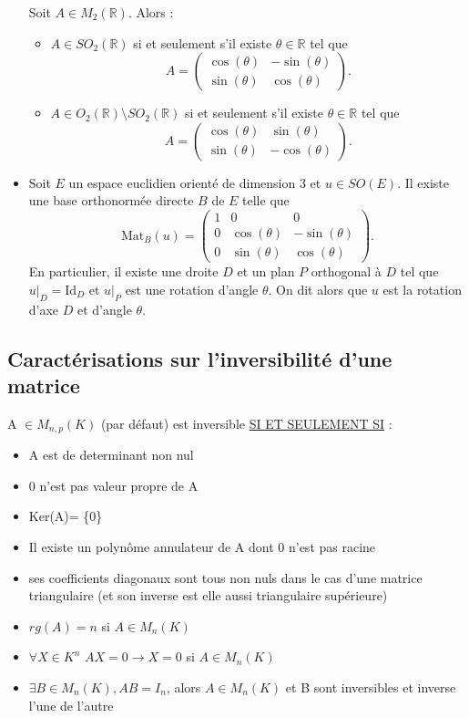 \documentclass{article}
\begin{document}
\begin{itemize}[label=$\ast$]
Soit $A \in M_2(\mathbb{R})$. Alors :
\begin{itemize}
    \item $A \in SO_2(\mathbb{R})$ si et seulement s'il existe $\theta \in \mathbb{R}$ tel que\[A = \begin{pmatrix}\cos(\theta) & -\sin(\theta) \\\sin(\theta) & \cos(\theta)\end{pmatrix}. \]  \item $A \in O_2(\mathbb{R}) \setminus SO_2(\mathbb{R})$ si et seulement s'il existe $\theta \in \mathbb{R}$ tel que \[A = \begin{pmatrix}
 \cos(\theta) & \sin(\theta) \\
    \sin(\theta) & -\cos(\theta)
    \end{pmatrix}.
    \]
\end{itemize}

\item Soit $E$ un espace euclidien orienté de dimension $3$ et $u \in SO(E)$. Il existe une base orthonormée directe $B$ de $E$ telle que
\[
\text{Mat}_B(u) = \begin{pmatrix}
1 & 0 & 0 \\
0 & \cos(\theta) & -\sin(\theta) \\
0 & \sin(\theta) & \cos(\theta)
\end{pmatrix}.
\]
En particulier, il existe une droite $D$ et un plan $P$ orthogonal à $D$ tel que $u|_D = \text{Id}_D$ et $u|_P$ est une rotation d'angle $\theta$. On dit alors que $u$ est la rotation d'axe $D$ et d'angle $\theta$.










\end{itemize}

\subsection{Caractérisations sur l'inversibilité d'une matrice}
A \( \in M_{n,p}(K) \) (par défaut) est inversible \underline{SI ET SEULEMENT SI} : 
\begin{itemize}[label=$\ast$]
	\item A est de determinant non nul
	\item 0 n'est pas valeur propre de A
	\item Ker(A)= \{0\}
	\item Il existe un polynôme annulateur de A dont 0 n'est pas racine
	\item ses coefficients diagonaux sont tous non nuls dans le cas d'une matrice triangulaire (et son inverse est elle aussi triangulaire supérieure)
	\item \(rg(A) = n\) si \(A \in M_n(K)\)
	\item \( \forall X \in K^n\) \(AX=0 \rightarrow X=0\) si \( A \in M_n(K) \) 
	\item \(\exists B \in M_n(K), AB = I_n\), alors \(A \in M_n(K)\) et B sont inversibles et inverse l'une de l'autre
\end{itemize}
\end{document}
